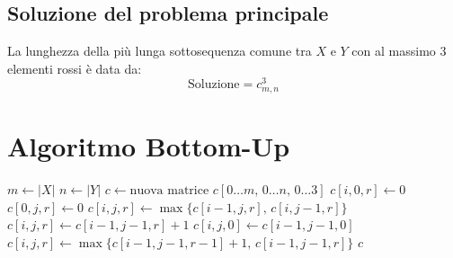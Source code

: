 \subsection{Soluzione del problema principale}
La lunghezza della più lunga sottosequenza comune tra $X$ e $Y$ con al massimo $3$ elementi rossi è data da:
\[
    \text{Soluzione} = c_{m, n}^3
\]

\section{Algoritmo Bottom-Up}
\begin{algorithm}[htbp]
\caption{Calcolo Bottom-Up per LCS con al massimo 3 simboli rossi}
\begin{algorithmic}[1]
    \State $m \gets |X|$
    \State $n \gets |Y|$
    \State $c \gets \text{nuova matrice } c[0 \dots m, \, 0 \dots n, \, 0 \dots 3]$
            \State $c[i, 0, r] \gets 0$
        \EndFor
    \EndFor
            \State $c[0, j, r] \gets 0$
        \EndFor
    \EndFor
                    \State $c[i, j, r] \gets \max \{ c[i-1, j, r], \, c[i, j-1, r] \}$
                \Else
                        \State $c[i, j, r] \gets c[i-1, j-1, r] + 1$
                    \Else
                            \State $c[i, j, 0] \gets c[i-1, j-1, 0]$
                        \Else
                            \State $c[i, j, r] \gets \max \{ c[i-1, j-1, r-1] + 1, \, c[i-1, j-1, r] \}$
                        \EndIf
                    \EndIf
                \EndIf
            \EndFor
        \EndFor
    \EndFor
    \State \Return $c$
\EndProcedure
\end{algorithmic}
\end{algorithm}

